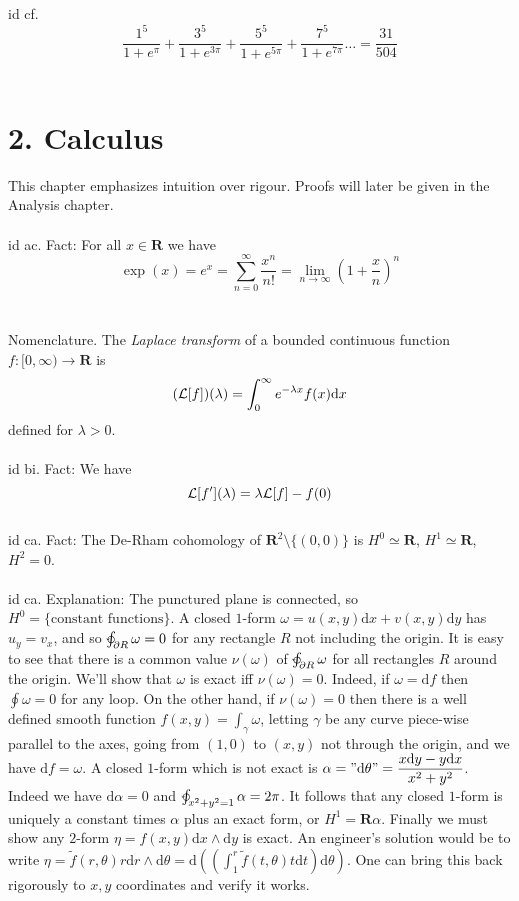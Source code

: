 \documentclass[oneside]{book}
\newcommand{\cint}{\varointctrclockwise}
\newcommand{\R}{\mathbf{R}}
\newcommand{\set}[1]{\{ #1\}}
\newcommand{\fit}[1]{\left( #1\right)}
\renewcommand{\d}{\mathrm{d}}
\newcommand\chap[1]{%
  \chapter*{#1}%
  \addcontentsline{toc}{chapter}{#1}}
\begin{document}
id cf. $$\dfrac{1^5}{1+e^\pi}+\dfrac{3^5}{1+e^{3\pi}}+\dfrac{5^5}{1+e^{5\pi}}+\dfrac{7^5}{1+e^{7\pi}}\dots = \dfrac{31}{504}$$\\




\newpage
\chap{2. Calculus}
This chapter emphasizes intuition over rigour. Proofs will later be given in the Analysis chapter.   \\\\


id ac. Fact: For all $x\in\R$ we have $$\exp(x)=e^x=\sum_{n=0}^\infty \frac{x^n}{n!} = \lim_{n\to\infty}\fit{1+\frac{x}{n}}^n$$     \\\\


Nomenclature. The {\it Laplace transform} of a bounded continuous function $f:[0,\infty)\to\R$ is $$(\LL[f])(\lambda)=\int_0^\infty e^{-\lambda x}f(x)\d x$$
defined for $\lambda > 0$. \\\\


id bi. Fact: We have $$\mathcal{L}[f'](\lambda)=\lambda\mathcal{L}[f] - f(0)$$ \\


id ca. Fact: The De-Rham cohomology of $\R^2\setminus\set{(0,0)}$ is $H^0\simeq \R$, $H^1\simeq \R$, $H^2=0$. \\\\


id ca. Explanation: The punctured plane is connected, so $H^0=\set{\text{constant functions}}$. A closed $1$-form $\omega = u(x,y)\d x+v(x,y)\d y$ has $u_y=v_x$, and so $ \cint_{\partial R}\omega = 0$ for any rectangle $R$ not including the origin. It is easy to see that there is a common value $\nu(\omega)$ of $\cint_{\partial R}\omega$ for all rectangles $R$ around the origin. We'll show that $\omega$ is exact iff $\nu(\omega)= 0$. Indeed, if $\omega = \d f$ then $\oint \omega=0$ for any loop. On the other hand, if $\nu(\omega)=0$ then there is a well defined smooth function $f(x,y)=\int_{\gamma} \omega$, letting $\gamma$ be any curve piece-wise parallel to the axes, going from $(1,0)$ to $(x,y)$ not through the origin, and we have $\d f=\omega$. A closed $1$-form which is not exact is $\alpha="\d \theta"=\dfrac{x\d y-y\d x}{x^2+y^2}$. Indeed we have $\d \alpha = 0$ and $\cint_{x^2+y^2=1}\alpha = 2\pi$. It follows that any closed $1$-form is uniquely a constant times $\alpha$ plus an exact form, or $H^1=\R\alpha$. Finally we must show any $2$-form $\eta=f(x,y)\d x\wedge \d y$ is exact. An engineer's solution would be to write
$\eta = \tilde{f}(r,\theta)r\d r\wedge \d\theta = \d\fit{\fit{\int_1^r \tilde{f}(t,\theta)t\d t}\d \theta}$. One can bring this back rigorously to $x,y$ coordinates and verify it works.  \\\\
\end{document}
